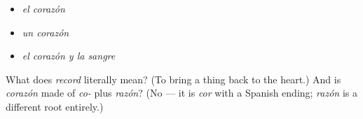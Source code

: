 \begin{itemize}
\raggedright
  \item \emph{el corazón}
  \item \emph{un corazón}
  \item \emph{el corazón y la sangre}
\end{itemize}

\begin{tcolorbox}[breakable,colback=teal!4,colframe=teal!35!black,title={Before you move on}]
What does \emph{record} literally mean? (To bring a thing back to the heart.) And is \emph{corazón} made of \emph{co-} plus \emph{razón}? (No — it is \emph{cor} with a Spanish ending; \emph{razón} is a different root entirely.)
\end{tcolorbox}
